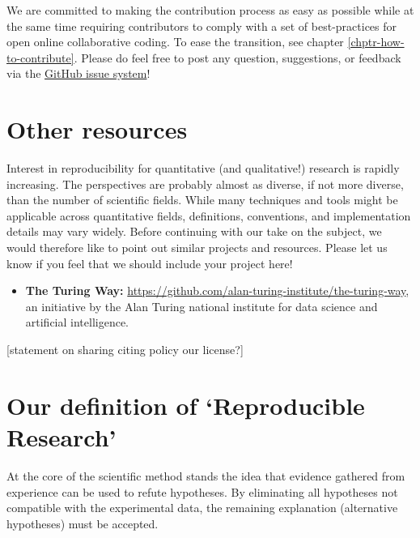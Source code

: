 \documentclass[]{book}
\providecommand{\tightlist}{%
  \setlength{\itemsep}{0pt}\setlength{\parskip}{0pt}}
\begin{document}
We are committed to making the contribution process as easy as possible
while at the same time requiring contributors to comply with a set of
best-practices for open online collaborative coding. To ease the
transition, see chapter \ref{chptr-how-to-contribute}. Please do feel
free to post any question, suggestions, or feedback via the
\href{(https://github.com/rr-mrc-bsu/reproducible-research/issues)}{GitHub
issue system}!

\section{Other resources}\label{other-resources}

Interest in reproducibility for quantitative (and qualitative!) research
is rapidly increasing. The perspectives are probably almost as diverse,
if not more diverse, than the number of scientific fields. While many
techniques and tools might be applicable across quantitative fields,
definitions, conventions, and implementation details may vary widely.
Before continuing with our take on the subject, we would therefore like
to point out similar projects and resources. Please let us know if you
feel that we should include your project here!

\begin{itemize}
\tightlist
\item
  \textbf{The Turing Way:}
  \url{https://github.com/alan-turing-institute/the-turing-way}, an
  initiative by the Alan Turing national institute for data science and
  artificial intelligence.
\end{itemize}

{[}statement on sharing citing policy our license?{]}

\section{\texorpdfstring{Our definition of `Reproducible
Research'}{Our definition of Reproducible Research}}\label{our-definition-of-reproducible-research}

At the core of the scientific method stands the idea that evidence
gathered from experience can be used to refute hypotheses. By
eliminating all hypotheses not compatible with the experimental data,
the remaining explanation (alternative hypotheses) must be accepted.
\end{document}
